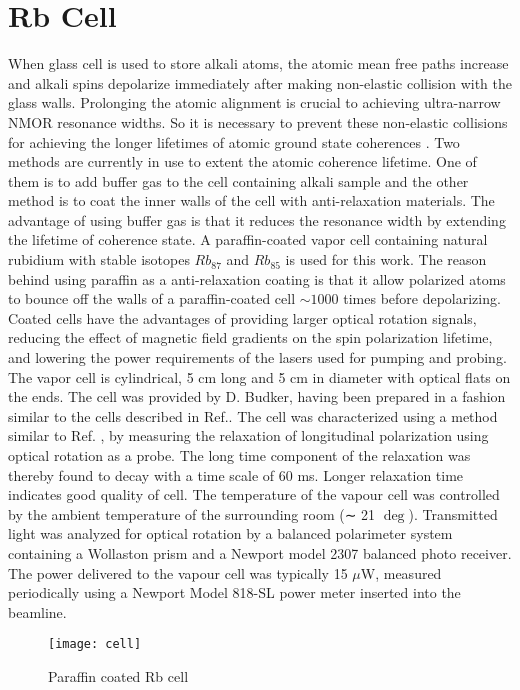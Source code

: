 \documentclass[12pt]{report}
\begin{document}
\section{Rb Cell}
When glass cell is used to store alkali atoms, the atomic mean free paths increase and alkali spins depolarize immediately after making non-elastic collision with the glass walls.
Prolonging the atomic alignment is crucial to achieving ultra-narrow NMOR
resonance widths. So it is necessary to prevent these non-elastic collisions for achieving the longer lifetimes of atomic ground state coherences \cite{PhysRevA.72.023401}\cite{Balabas:10}  \cite{doi:10.1063/1.3236649}. Two methods are currently in use to extent the atomic coherence lifetime. One of them is to add buffer gas to the cell containing alkali sample and the other method is to coat the inner walls of the cell with anti-relaxation materials. The advantage of using buffer gas is that it reduces the resonance width by extending the lifetime of coherence state. A paraffin-coated vapor cell containing  natural rubidium with stable isotopes $Rb_{87}$ and $Rb_{85}$ is used for this work. The reason behind using paraffin as a anti-relaxation coating is that it allow polarized atoms to bounce off the walls of a paraffin-coated cell $\sim 1000$ times before depolarizing\cite{PhysRev.147.41}\cite{PhysRevA.72.023401}. Coated cells have the advantages of providing larger optical rotation
signals, reducing the effect of magnetic field gradients on the spin polarization lifetime,
and lowering the power requirements of the lasers used for pumping and probing. The vapor cell is cylindrical, 5 cm long and 5 cm in diameter with optical
flats on the ends. The cell was provided by D. Budker, having been prepared in
a fashion similar to the cells described in Ref.\cite{PhysRevA.72.023401}. The cell was characterized
using a method similar to Ref. \cite{PhysRevA.72.023401}, by measuring the relaxation of longitudinal
polarization using optical rotation as a probe. The long time component of the
relaxation was thereby found to decay with a time scale of 60 ms.  Longer relaxation time indicates good quality of cell. The temperature of the vapour cell was controlled by the ambient temperature of the surrounding room (∼ 21 $\deg$). Transmitted light was analyzed for optical rotation by a balanced polarimeter system containing a Wollaston prism and a Newport model 2307 balanced photo receiver. The power delivered to the vapour cell was typically 15 $\mu$W, measured periodically using a Newport Model 818-SL power meter inserted into the
beamline. 
\begin{figure}[h]
\centering
\texttt{[image: cell]}
\caption{Paraffin coated Rb cell}
\end{figure}
\newpage
\end{document}
